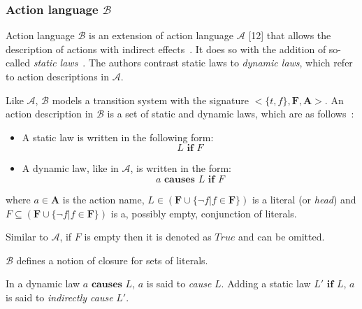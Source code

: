 \subsubsection{Action language $ \mathcal{B} $}
\label{subsubsec:action_language_b}

Action language $ \mathcal{B} $ is an extension of action language $ \mathcal{A} $ [12] that allows the description of actions with indirect effects~\citep{gelfond_action_1998}.
It does so with the addition of so-called \textit{static laws}~\citep{gelfond_action_1998}.
The authors contrast static laws to \textit{dynamic laws}, which refer to action descriptions in $\mathcal{A}$.

Like $\mathcal{A}$, $\mathcal{B}$ models a transition system with the signature $<\{t, f\},\boldsymbol{F},\boldsymbol{A}>$.
An action description in $\mathcal{B}$ is a set of static and dynamic laws, which are as follows~\citep{gelfond_action_1998}:

\begin{itemize}
    \item A static law is written in the following form:
        \begin{equation}
            L \textbf{ if } F
        \end{equation}

    \item A dynamic law, like in $\mathcal{A}$, is written in the form:
        \begin{equation}
            a \textbf{ causes } L \textbf{ if } F
        \end{equation}
\end{itemize}

\noindent
where $a \in \boldsymbol{A}$ is the action name, $L \in(\boldsymbol{F} \cup\{\neg f | f \in \boldsymbol{F}\})$ is a literal (or \textit{head}) and $F \subseteq(\boldsymbol{F} \cup\{\neg f | f \in \boldsymbol{F}\})$ is a, possibly empty, conjunction of literals.

Similar to $\mathcal{A}$, if $F$ is empty then it is denoted as $True$ and can be omitted.

$\mathcal{B}$ defines a notion of closure for sets of literals.

\begin{definition}
    \label{def:causation}
    In a dynamic law $a \textbf{ causes } L$, $a$ is said to \textit{cause} $L$.
    Adding a static law $L' \textbf{ if } L$, $a$ is said to \textit{indirectly cause} $L'$.
\end{definition}

